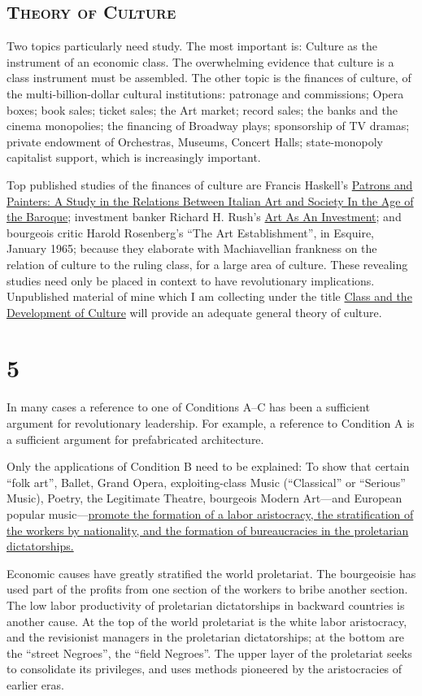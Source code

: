 \subsection*{\textsc{Theory of Culture}}
Two topics particularly need study. The most important is: Culture as the instrument of an economic class. The overwhelming evidence that culture is a class instrument must be assembled. The other topic is the finances of culture, of the multi-billion-dollar cultural institutions: patronage and commissions; Opera boxes; book sales; ticket sales; the Art market; record sales; the banks and the cinema monopolies; the financing of Broadway plays; sponsorship of TV dramas; private endowment of Orchestras, Museums, Concert Halls; state-monopoly capitalist support, which is increasingly important. 

Top published studies of the finances of culture are Francis Haskell's \uline{Patrons and Painters: A Study in the Relations Between Italian Art and Society In the Age of the Baroque}; investment banker Richard H. Rush's \uline{Art As An Investment}; and bourgeois critic Harold Rosenberg's \enquote{The Art Establishment}, in Esquire, January 1965; because they elaborate with Machiavellian frankness on the relation of culture to the ruling class, for a large area of culture. These revealing studies need only be placed in context to have revolutionary implications. Unpublished material of mine which I am collecting under the title \uline{Class and the Development of Culture} will provide an adequate general theory of culture. 

\section*{5}

In many cases a reference to one of Conditions A--C has been a sufficient argument for revolutionary leadership. For example, a reference to Condition A is a sufficient argument for prefabricated architecture. 

Only the applications of Condition B need to be explained: To show that certain \enquote{folk art}, Ballet, Grand Opera, exploiting-class Music (\enquote{Classical} or \enquote{Serious} Music), Poetry, the Legitimate Theatre, bourgeois Modern Art---and European popular music---\uline{promote the formation of a labor aristocracy, the stratification of the workers by nationality, and the formation of bureaucracies in the proletarian dictatorships.}

Economic causes have greatly stratified the world proletariat. The bourgeoisie has used part of the profits from one section of the workers to bribe another section. The low labor productivity of proletarian dictatorships in backward countries is another cause. At the top of the world proletariat is the white labor aristocracy, and the revisionist managers in the proletarian dictatorships; at the bottom are the \enquote{street Negroes}, the \enquote{field Negroes}. The upper layer of the proletariat seeks to consolidate its privileges, and uses methods pioneered by the aristocracies of earlier eras. 

